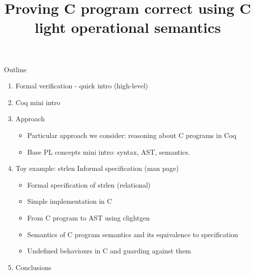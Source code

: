 \documentclass{beamer}
\title{Proving C program correct using C light operational semantics}
\date{ }
\begin{document}
\maketitle

\begin{frame}{Outline}
\begin{enumerate}
\item Formal verification - quick intro (high-level)
\item Coq mini intro 

\item Approach
\begin{itemize}   
\item Particular approach we consider: reasoning about C programs in Coq
\item Base PL concepts mini intro: syntax, AST, semantics.
\end{itemize}{}
\item Toy example: strlen Informal specification (man page)
\begin{itemize}

\item Formal specification of strlen (relational)
\item Simple implementation in C
\item From C program to AST using clightgen
\item Semantics of C program semantics and its equivalence to specification
\item Undefined behaviours in C and guarding against them
\end{itemize}{}
\item Conclusions
\end{enumerate} 
\end{frame}{}

\end{document}
